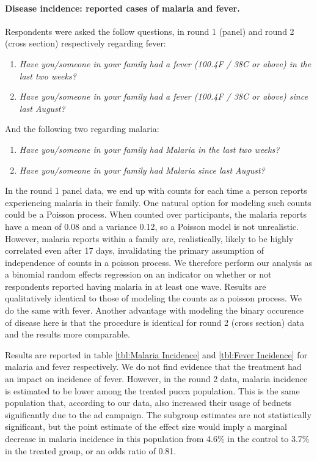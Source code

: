 \documentclass[a4paper,12pt]{article}
\begin{document}
\paragraph{Disease incidence: reported cases of malaria and fever.} Respondents were asked the follow questions, in round 1 (panel) and round 2 (cross section) respectively regarding fever:
\begin{enumerate}
\item \textit{Have you/someone in your family had a fever (100.4F / 38C or above) in the last two weeks?}
\item \textit{Have you/someone in your family had a fever (100.4F / 38C or above) since last August?}
\end{enumerate}

\noindent And the following two regarding malaria:
\begin{enumerate}
\item \textit{Have you/someone in your family had Malaria in the last two weeks?}
\item \textit{Have you/someone in your family had Malaria since last August?}
\end{enumerate}

In the round 1 panel data, we end up with counts for each time a person reports experiencing malaria in their family. One natural option for modeling such counts could be a Poisson process. When counted over participants, the malaria reports have a mean of 0.08 and a variance 0.12, so a Poisson model is not unrealistic. However, malaria reports within a family are, realistically, likely to be highly correlated even after 17 days, invalidating the primary assumption of independence of counts in a poisson process. We therefore perform our analysis as a binomial random effects regression on an indicator on whether or not respondents reported having malaria in at least one wave. Results are qualitatively identical to those of modeling the counts as a poisson process. We do the same with fever. Another advantage with modeling the binary occurence of disease here is that the procedure is identical for round 2 (cross section) data and the results more comparable.

Results are reported in table \ref{tbl:Malaria Incidence} and \ref{tbl:Fever Incidence} for malaria and fever respectively. We do not find evidence that the treatment had an impact on incidence of fever. However, in the round 2 data, malaria incidence is estimated to be lower among the treated pucca population. This is the same population that, according to our data, also increased their usage of bednets significantly due to the ad campaign. The subgroup estimates are not statistically significant, but the point estimate of the effect size would imply a marginal decrease in malaria incidence in this population from 4.6\% in the control to 3.7\% in the treated group, or an odds ratio of 0.81.
\end{document}
